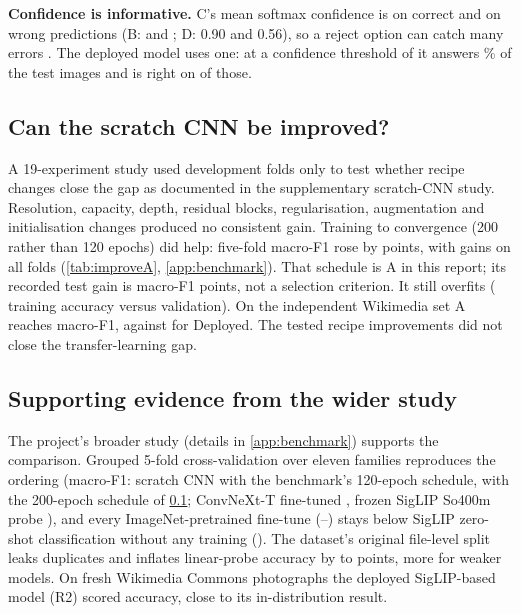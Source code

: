 \documentclass[11pt,a4paper]{article}
\begin{document}
\textbf{Confidence is informative.} C's mean softmax confidence is \confOkC on correct and \confBadC on wrong
predictions (B: \confOkB and \confBadB; D: 0.90 and 0.56), so a reject option can catch many errors \citep{chow1970reject,
geifman2017selective}. The deployed model uses one: at a confidence threshold of \ftThr it answers \ftCov\% of the
test images and is right on \ftAccepted of those.

\subsection{Can the scratch CNN be improved?}\label{sec:improveA}
A 19-experiment study used development folds only to test whether recipe changes close the gap
as documented in the supplementary scratch-CNN study. Resolution, capacity, depth, residual blocks,
regularisation, augmentation and initialisation changes produced no consistent gain. Training to convergence
(200 rather than 120 epochs) did help: five-fold macro-F1 rose by \imprSchedGain{} points, with gains on all folds
(\cref{tab:improveA}, \cref{app:benchmark}). That schedule is A in this report; its recorded test gain is
\imprTestGain{} macro-F1 points, not a selection criterion. It still overfits (\trainAccA{} training accuracy versus
\valAccA{} validation). On the independent Wikimedia set A reaches \imprHoldA{} macro-F1, against \whFone{} for
Deployed. The tested recipe improvements did not close the transfer-learning gap.

\subsection{Supporting evidence from the wider study}\label{sec:further}
The project's broader study (details in \cref{app:benchmark}) supports the comparison.
Grouped 5-fold cross-validation over eleven families reproduces the ordering (macro-F1: scratch CNN \bmScratch
with the benchmark's 120-epoch schedule, \imprFiveA with the 200-epoch schedule of \cref{sec:improveA};
ConvNeXt-T fine-tuned \bmConvnext, frozen SigLIP So400m probe \bmProbeSiglip), and every ImageNet-pretrained fine-tune
(\bmImagenetLo--\bmImagenetHi) stays below SigLIP zero-shot classification without any training (\bmZeroSiglip).
The dataset's original file-level split leaks duplicates and inflates linear-probe accuracy by \inflSiglip to
\inflResnet points, more for weaker models. On \whN fresh Wikimedia Commons photographs the deployed SigLIP-based model
(R2) scored \whAcc accuracy, close to its in-distribution result.
\end{document}
